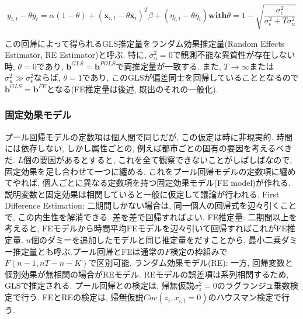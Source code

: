 \documentclass[paper=a4paper,fontsize=10pt]{jlreq}
\begin{document}
\begin{equation*}
  y_{i,t} - \theta\bar{y}_{i}= \alpha(1-\theta) + (\mathbf{x}_{i,t} - \theta\bar{\mathbf{x}}_{i})^T \beta + (\eta_{i,t} - \theta\bar{\eta}_{i})　\mathbf{with}　\theta = 1 - \sqrt{\frac{\sigma_\epsilon^2}{\sigma_\epsilon^2 + T \sigma_u^2}}
\end{equation*}

この回帰によって得られるGLS推定量をランダム効果推定量(Random Effects Estimator, RE Estimator)と呼ぶ. 特に, $\sigma_u^2 = 0$で観測不能な異質性が存在しない時, $\theta = 0$であり, $\mathbf{b}^{GLS} = \mathbf{b}^{POLS}$で両推定量が一致する. また, $T \to \infty$または$\sigma_u^2 \gg \sigma_\epsilon^2$ならば, $\theta = 1$であり, このGLSが偏差同士を回帰していることとなるので$\mathbf{b}^{GLS} = \mathbf{b}^{FE}$となる(FE推定量は後述, 既出のそれの一般化).\\

\subsubsection{固定効果モデル}
プール回帰モデルの定数項は個人間で同じだが, この仮定は時に非現実的. 時間には依存しない, しかし属性ごとの, 例えば都市ごとの固有の要因を考えるべきだ. $L$個の要因があるとすると, これを全て観察できないことがしばしばなので, 固定効果を足し合わせて一つに纏める. これをプール回帰モデルの定数項に纏めてやれば, 個人ごとに異なる定数項を持つ固定効果モデル(FE model)が作れる. 説明変数と固定効果は相関していると一般に仮定して議論が行われる. First Difference Estimation: 二期間しかない場合は, 同一個人の回帰式を辺々引くことで, この内生性を解消できる. 差を差で回帰すればよい. FE推定量: 二期間以上を考えると, FEモデルから時間平均FEモデルを辺々引いて回帰すればこれがFE推定量. $n$個のダミーを追加したモデルと同じ推定量をだすことから, 最小二乗ダミー推定量とも呼ぶ.プール回帰とFEは通常の$F$検定の枠組みで$F(n - 1, nT - n - K)$で区別可能. ランダム効果モデル(RE): 一方, 回帰変数と個別効果が無相関の場合がREモデル. REモデルの誤差項は系列相関するため, GLSで推定される. プール回帰との検定は, 帰無仮説$\sigma_z^2=0$のラグランジュ乗数検定で行う. FEとREの検定は, 帰無仮説$Cov(z_i, x_{i,t}=0)$のハウスマン検定で行う.
\end{document}
